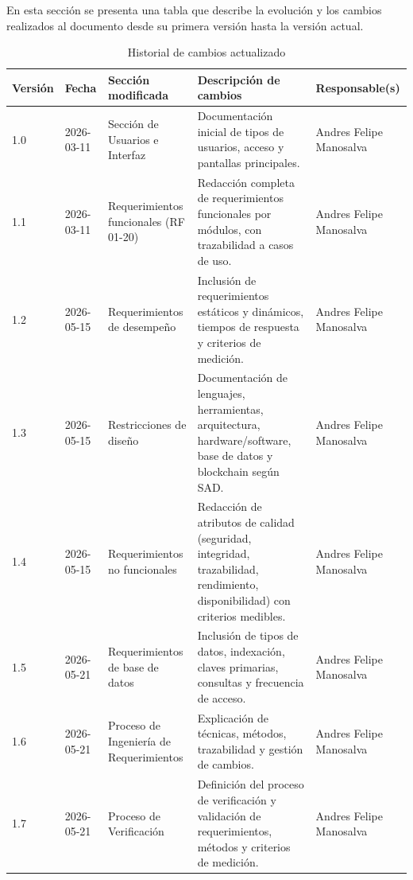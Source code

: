 \documentclass[12pt,letterpaper]{article}
\begin{document}
En esta sección se presenta una tabla que describe la evolución y los cambios
realizados al documento desde su primera versión hasta la versión actual.

\begin{table}[h]
    \centering
    \scriptsize
    \renewcommand{\arraystretch}{1.2}
    \begin{tabular}{p{1cm}p{2cm}p{3.5cm}p{6.5cm}p{3cm}}
        \toprule
        \textbf{Versión} & \textbf{Fecha} & \textbf{Sección modificada} &
        \textbf{Descripción de cambios} & \textbf{Responsable(s)} \\
        \midrule
        1.0 & 2026-03-11 & Sección de Usuarios e Interfaz &
        Documentación inicial de tipos de usuarios, acceso y pantallas principales. &
        Andres Felipe Manosalva \\

        1.1 & 2026-03-11 & Requerimientos funcionales (RF 01-20) &
        Redacción completa de requerimientos funcionales por módulos, con trazabilidad a casos de uso. &
        Andres Felipe Manosalva \\

        1.2 & 2026-05-15 & Requerimientos de desempeño &
        Inclusión de requerimientos estáticos y dinámicos, tiempos de respuesta y criterios de medición. &
        Andres Felipe Manosalva \\

        1.3 & 2026-05-15 & Restricciones de diseño &
        Documentación de lenguajes, herramientas, arquitectura, hardware/software, base de datos y blockchain según SAD. &
        Andres Felipe Manosalva \\

        1.4 & 2026-05-15 & Requerimientos no funcionales &
        Redacción de atributos de calidad (seguridad, integridad, trazabilidad, rendimiento, disponibilidad) con criterios medibles. &
        Andres Felipe Manosalva \\

        1.5 & 2026-05-21 & Requerimientos de base de datos &
        Inclusión de tipos de datos, indexación, claves primarias, consultas y frecuencia de acceso. &
        Andres Felipe Manosalva \\

        1.6 & 2026-05-21 & Proceso de Ingeniería de Requerimientos &
        Explicación de técnicas, métodos, trazabilidad y gestión de cambios. &
        Andres Felipe Manosalva \\

        1.7 & 2026-05-21 & Proceso de Verificación &
        Definición del proceso de verificación y validación de requerimientos, métodos y criterios de medición. &
        Andres Felipe Manosalva \\
        \bottomrule
    \end{tabular}
    \caption{Historial de cambios actualizado}
    \label{tab:historial_cambios}
\end{table}
\end{document}
